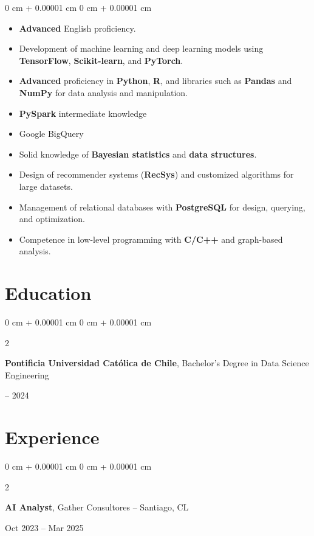 \documentclass[10pt, letterpaper]{article}
\newenvironment{highlightsforbulletentries}{
    \begin{itemize}[
        topsep=0.10 cm,
        parsep=0.10 cm,
        partopsep=0pt,
        itemsep=0pt,
        leftmargin=10pt
    ]
}{
    \end{itemize}
} %
\newenvironment{onecolentry}{
    \begin{adjustwidth}{
        0 cm + 0.00001 cm
    }{
        0 cm + 0.00001 cm
    }
}{
    \end{adjustwidth}
} %
\newenvironment{twocolentry}[2][]{
    \onecolentry
    \def\secondColumn{#2}
    \setcolumnwidth{\fill, 4.5 cm}
    \begin{paracol}{2}
}{
    \switchcolumn \raggedleft \secondColumn
    \end{paracol}
    \endonecolentry
} %
\begin{document}
\begin{onecolentry}
    \begin{highlightsforbulletentries}

\begin{itemize}
    \item \textbf{Advanced} English proficiency.
    \item Development of machine learning and deep learning models using \textbf{TensorFlow}, \textbf{Scikit-learn}, and \textbf{PyTorch}.
    \item \textbf{Advanced} proficiency in \textbf{Python}, \textbf{R}, and libraries such as \textbf{Pandas} and \textbf{NumPy} for data analysis and manipulation.
    \item \textbf{PySpark} intermediate knowledge 
    \item Google BigQuery
    \item Solid knowledge of \textbf{Bayesian statistics} and \textbf{data structures}.
    \item Design of recommender systems (\textbf{RecSys}) and customized algorithms for large datasets.
    \item Management of relational databases with \textbf{PostgreSQL} for design, querying, and optimization.
    \item Competence in low-level programming with \textbf{C/C++} and graph-based analysis.
\end{itemize}
    \end{highlightsforbulletentries}
\end{onecolentry}

\section{Education}

\begin{twocolentry}{
    2021 – 2024
}
    \textbf{Pontificia Universidad Católica de Chile}, Bachelor's Degree in Data Science Engineering
\end{twocolentry}

\section{Experience}

\begin{twocolentry}{Oct 2023 – Mar 2025}
    \textbf{AI Analyst}, Gather Consultores -- Santiago, CL
\end{twocolentry}
\end{document}
